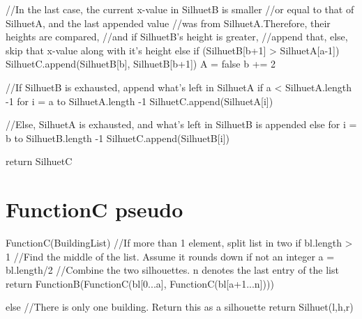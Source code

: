 \documentclass[a4paper,oneside,article,11pt]{memoir}
\begin{document}
\begin{VerbatimTest}
        //In the last case, the current x-value in SilhuetB is smaller 
        //or equal to that of SilhuetA, and the last appended value 
        //was from SilhuetA.Therefore, their heights are compared, 
        //and if SilhuetB's height is greater, 
        //append that, else, skip that x-value along with it's height
        else
            if (SilhuetB[b+1] > SilhuetA[a-1])
                SilhuetC.append(SilhuetB[b], SilhuetB[b+1])
                A = false
            b += 2

    //If SilhuetB is exhausted, append what's left in SilhuetA
    if a < SilhuetA.length -1
        for i = a to SilhuetA.length -1
            SilhuetC.append(SilhuetA[i])

    //Else, SilhuetA is exhausted, and what's left in SilhuetB is appended
    else
        for i = b to SilhuetB.length -1
            SilhuetC.append(SilhuetB[i])

    return SilhuetC
\end{VerbatimTest}

\section*{FunctionC pseudo}
\begin{VerbatimTest}
FunctionC(BuildingList)
    //If more than 1 element, split list in two
    if bl.length > 1        
        //Find the middle of the list. Assume it rounds down if not an integer
        a = bl.length/2    
        //Combine the two silhouettes. n denotes the last entry of the list
        return FunctionB(FunctionC(bl[0...a], FunctionC(bl[a+1...n])))
        
    else
        //There is only one building. Return this as a silhouette
        return Silhuet(l,h,r)
\end{VerbatimTest}
\end{document}
